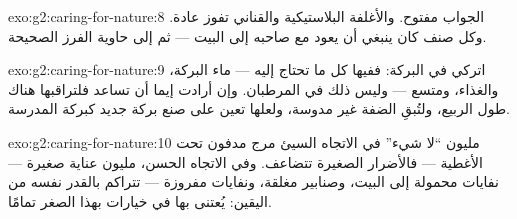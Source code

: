 \begin{solution}{exo:g2:caring-for-nature:8}
الجواب مفتوح. والأغلفة البلاستيكية والقناني تفوز عادة. وكل صنف كان
ينبغي أن يعود مع صاحبه إلى البيت --- ثم إلى حاوية الفرز الصحيحة.
\end{solution}

\begin{solution}{exo:g2:caring-for-nature:9}
اتركي  في البركة: ففيها كل ما تحتاج إليه --- ماء البركة،
والغذاء، ومتسع   --- وليس ذلك في المرطبان. وإن أرادت
إيما أن تساعد فلتراقبها هناك طول الربيع، ولتُبقِ الضفة غير مدوسة،
ولعلها تعين على صنع  بركة جديد كبركة المدرسة.
\end{solution}

\begin{solution}{exo:g2:caring-for-nature:10}
مليون ``لا شيء'' في الاتجاه السيئ مرج مدفون تحت الأغطية ---
فالأضرار الصغيرة تتضاعف. وفي الاتجاه الحسن، مليون عناية صغيرة ---
نفايات محمولة إلى البيت، وصنابير مغلقة، ونفايات مفروزة --- تتراكم
بالقدر نفسه من اليقين:  يُعتنى بها في خيارات بهذا الصغر
تمامًا.
\end{solution}
